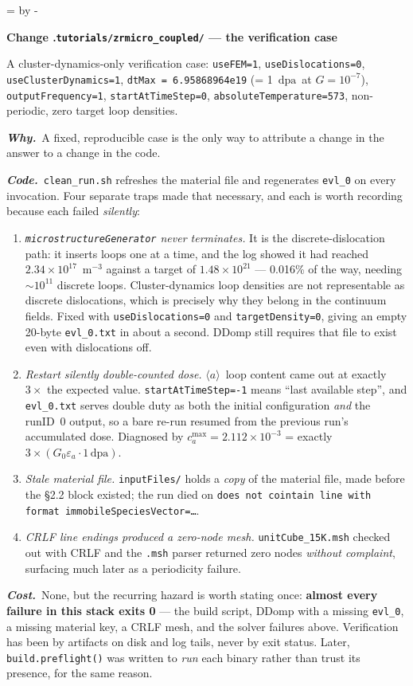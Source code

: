 \documentclass[11pt,a4paper]{article}
\newcommand{\code}[1]{\texttt{\small #1}}
\newcommand{\dpa}{\ensuremath{\mathrm{dpa}}}
\newcommand{\aloop}{\ensuremath{\langle a\rangle}}
\newcommand{\needlines}[1]{%
  \par\dimen0=\pagegoal \advance\dimen0 by -\pagetotal
  \ifdim\dimen0<#1\baselineskip \newpage \fi}
\newcounter{chg}
\newcommand{\change}[1]{%
  \needlines{4}%
  \refstepcounter{chg}%
  \par\medskip\noindent
  {\bfseries\boldmath Change \thechg.\quad #1}%
  \par\nobreak\smallskip}
\newcommand{\why}[1]{\par\noindent\textbf{\itshape Why.}\ #1\par}
\newcommand{\impact}[1]{\par\noindent\textbf{\itshape Code.}\ #1\par}
\newcommand{\cost}[1]{\par\noindent\textbf{\itshape Cost.}\ #1\par}
\begin{document}
\change{\code{tutorials/zrmicro\_coupled/} --- the verification case}
\label{chg:usecase}
A cluster-dynamics-only verification case: \code{useFEM=1},
\code{useDislocations=0}, \code{useClusterDynamics=1},
\code{dtMax = 6.95868964e19} (= 1~\dpa\ at $G = 10^{-7}$),
\code{outputFrequency=1}, \code{startAtTimeStep=0},
\code{absoluteTemperature=573}, non-periodic, zero target loop densities.
\why{A fixed, reproducible case is the only way to attribute a change in the
answer to a change in the code.}
\impact{\code{clean\_run.sh} refreshes the material file and regenerates
\code{evl\_0} on every invocation. Four separate traps made that necessary,
and each is worth recording because each failed \emph{silently}:

\begin{enumerate}\itemsep2pt
\item \emph{\code{microstructureGenerator} never terminates.} It is the
  discrete-dislocation path: it inserts loops one at a time, and the log showed
  it had reached $2.34\times10^{17}$~m$^{-3}$ against a target of
  $1.48\times10^{21}$ --- 0.016\% of the way, needing $\sim10^{11}$ discrete
  loops. Cluster-dynamics loop densities are not representable as discrete
  dislocations, which is precisely why they belong in the continuum fields.
  Fixed with \code{useDislocations=0} and \code{targetDensity=0}, giving an
  empty 20-byte \code{evl\_0.txt} in about a second. DDomp still requires that
  file to exist even with dislocations off.
\item \emph{Restart silently double-counted dose.} \aloop\ loop content came
  out at exactly $3\times$ the expected value. \code{startAtTimeStep=-1} means
  ``last available step'', and \code{evl\_0.txt} serves double duty as both the
  initial configuration \emph{and} the runID~0 output, so a bare re-run resumed
  from the previous run's accumulated dose. Diagnosed by
  $c_a^{\max} = 2.112\times10^{-3}$ = exactly $3\times(G_0\varepsilon_a\cdot
  1\,\dpa)$.
\item \emph{Stale material file.} \code{inputFiles/} holds a \emph{copy} of the
  material file, made before the \S2.2 block existed; the run died on
  \code{does not cointain line with format immobileSpeciesVector=…}.
\item \emph{CRLF line endings produced a zero-node mesh.} \code{unitCube\_15K.msh}
  checked out with CRLF and the \code{.msh} parser returned zero nodes
  \emph{without complaint}, surfacing much later as a periodicity failure.
\end{enumerate}}
\cost{None, but the recurring hazard is worth stating once: \textbf{almost
every failure in this stack exits 0} --- the build script, DDomp with a missing
\code{evl\_0}, a missing material key, a CRLF mesh, and the solver failures
above. Verification has been by artifacts on disk and log tails, never by exit
status. Later, \code{build.preflight()} was written to \emph{run} each binary
rather than trust its presence, for the same reason.}
\end{document}
